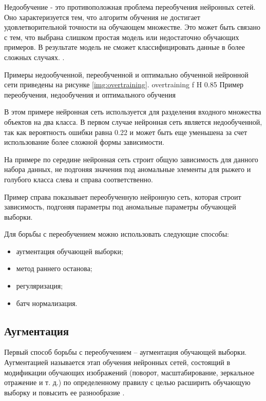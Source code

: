 Недообучение - это противоположная проблема переобучения нейронных сетей. Оно характеризуется тем, что алгоритм обучения не достигает удовлетворительной точности на обучающем множестве. Это может быть связано с тем, что выбрана слишком простая модель или недостаточно обучающих примеров. В результате модель не сможет классифицировать данные в более сложных случаях. \cite{overtraining1}.

Примеры недообученной, переобученной и оптимально обученной нейронной сети приведены на рисунке \ref{img:overtraining}.
{overtraining} %
{f} %
{H} %
{0.85\textwidth} %
{Пример переобучения, недообучения и оптимального обучения} %

В этом примере нейронная сеть используется для разделения входного множества объектов на два класса. В первом случае нейронная сеть является недообученной, так как вероятность ошибки равна 0.22 и может быть еще уменьшена за счет использование более сложной формы зависимости.

На примере по середине нейронная сеть строит общую зависимость для данного набора данных, не подгоняя значения под аномальные элементы для рыжего и голубого класса слева и справа соответственно.

Пример справа показывает переобученную нейронную сеть, которая строит зависимость, подгоняя параметры под аномальные параметры обучающей выборки.

Для борьбы с переобучением можно использовать следующие способы:
\begin{itemize}
	\item аугментация обучающей выборки;
	\item метод раннего останова;
	\item регуляризация;
	\item батч нормализация.
\end{itemize}

\subsection{Аугментация}
Первый способ борьбы с переобучением -- аугментация обучающей выборки. Аугментацией называется этап обучения нейронных сетей, состоящий в модификации обучающих изображений (поворот, масштабирование, зеркальное отражение и т. д.) по определенному правилу с целью расширить обучающую выборку и повысить ее разнообразие \cite{augmentation}.

